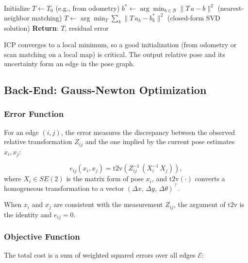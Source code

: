 \documentclass[11pt,a4paper]{article}
\theoremstyle{definition}
\theoremstyle{plain}
\theoremstyle{remark}
\begin{document}
\begin{algorithm}
\caption{ICP}
\begin{algorithmic}
\STATE Initialize $T \leftarrow T_0$ (e.g., from odometry)
\REPEAT
        \STATE $b^* \leftarrow \arg\min_{b \in \mathcal{B}} \|T\,a - b\|^2$ \hfill (nearest-neighbor matching)
    \ENDFOR
    \STATE $T \leftarrow \arg\min_T \sum_k \|T\,a_k - b_k^*\|^2$ \hfill (closed-form SVD solution)
\STATE \textbf{Return}: $T$, residual error
\end{algorithmic}
\end{algorithm}

ICP converges to a local minimum, so a good initialization (from odometry or scan matching on a local map) is critical. The output relative pose and its uncertainty form an edge in the pose graph.

\subsection{Back-End: Gauss-Newton Optimization}

\subsubsection{Error Function}

For an edge $(i,j)$, the error measures the discrepancy between the observed relative transformation $Z_{ij}$ and the one implied by the current pose estimates $x_i, x_j$:

\begin{tcolorbox}[colback=blue!5!white,colframe=blue!75!black,title=\textbf{Edge Error}]
\[
    e_{ij}(x_i, x_j) = \mathrm{t2v}\!\left(Z_{ij}^{-1}\,(X_i^{-1}\,X_j)\right),
\]
where $X_i \in SE(2)$ is the matrix form of pose $x_i$, and $\mathrm{t2v}(\cdot)$ converts a homogeneous transformation to a vector $(\Delta x,\, \Delta y,\, \Delta\theta)^\top$. %
\end{tcolorbox}

When $x_i$ and $x_j$ are consistent with the measurement $Z_{ij}$, the argument of $\mathrm{t2v}$ is the identity and $e_{ij} = 0$.

\subsubsection{Objective Function}

The total cost is a sum of weighted squared errors over all edges $\mathcal{E}$:
\end{document}
